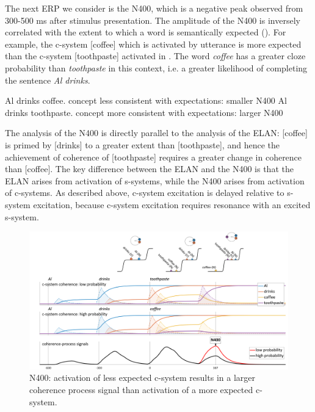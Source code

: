   The next ERP we consider is the N400, which is a negative peak observed from 300-500 ms after stimulus presentation. The amplitude of the N400 is inversely correlated with the extent to which a word is semantically expected (\citealt{FedermeierLaszlo2009,Friederici2002,KutasFedermeier2011}). For example, the c-system [coffee] which is activated by utterance  is more expected than the c-system [toothpaste] activated in . The word \textit{coffee} has a greater cloze probability than \textit{toothpaste} in this context, i.e. a greater likelihood of completing the sentence \textit{Al drinks}.

\ea\label{ex:6:24}
\ea\label{ex:6:24a} Al drinks coffee. \hspace{3mm} concept less consistent with expectations: smaller N400
\ex\label{ex:6:24b} Al drinks toothpaste. \hspace{3mm} concept more consistent with expectations: larger N400
\z
\z

The analysis of the N400 is directly parallel to the analysis of the ELAN: [coffee] is primed by [drinks] to a greater extent than [toothpaste], and hence the achievement of coherence of [toothpaste] requires a greater change in coherence than [coffee]. The key difference between the ELAN and the N400 is that the ELAN arises from activation of s-systems, while the N400 arises from activation of c-systems. As described above, c-system excitation is delayed relative to s-system excitation, because c-system excitation requires resonance with an excited s-system.

  
\begin{figure}
\includegraphics[width=\textwidth]{figures/Tilsen-img143.png}
\caption{N400: activation of less expected c-system results in a larger coherence process signal than activation of a more expected c-system.}
\label{fig:6:24}
\end{figure}
 

